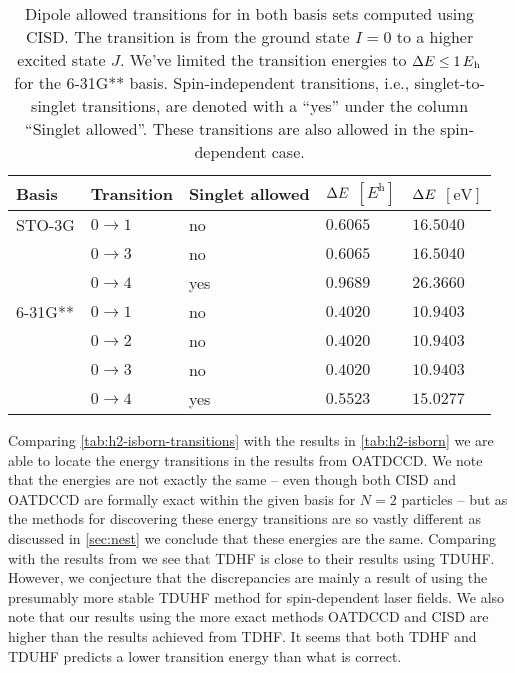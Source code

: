         \begin{table}
            \centering
            \caption{Dipole allowed transitions for  in both basis sets
            computed using CISD.
            The transition is from the ground state $I = 0$ to a higher excited
            state $J$.
            We've limited the transition energies to $\Delta \energy \leq
            \SI{1}{\hartree}$ for the 6-31G** basis.
            Spin-independent transitions, i.e., singlet-to-singlet transitions,
            are denoted with a ``yes'' under the column ``Singlet allowed''.
            These transitions are also allowed in the spin-dependent case.}
            \begin{tabular}{@{}lllll@{}}
                \toprule
                Basis & Transition & Singlet allowed
                & $\Delta E$ $[\si{\hartree}]$
                & $\Delta E$ $[\si{\electronvolt}]$ \\
                \midrule
                STO-3G & $0 \to 1$ & no & $0.6065$ & $16.5040$ \\
                & $0 \to 3$ & no & $0.6065$ & $16.5040$ \\
                & $0 \to 4$ & yes & $0.9689$ & $26.3660$ \\
                6-31G** & $0 \to 1$ & no & $0.4020$ & $10.9403$ \\
                & $0 \to 2$ & no & $0.4020$ & $10.9403$ \\
                & $0 \to 3$ & no & $0.4020$ & $10.9403$ \\
                & $0 \to 4$ & yes & $0.5523$ & $15.0277$ \\
                \bottomrule
            \end{tabular}
            \label{tab:h2-isborn-transitions}
        \end{table}
        Comparing \autoref{tab:h2-isborn-transitions} with the results in
        \autoref{tab:h2-isborn} we are able to locate the energy transitions in the
        results from OATDCCD.
        We note that the energies are not exactly the same -- even though both
        CISD and OATDCCD are formally exact within the given basis for $N = 2$
        particles -- but as the methods for discovering these energy transitions
        are so vastly different as discussed in \autoref{sec:nest} we conclude
        that these energies are the same.
        Comparing with the results from \citeauthor{isborn} we see that TDHF is
        close to their results using TDUHF.
        However, we conjecture that the discrepancies are mainly a result of
        \citeauthor{isborn} using the presumably more stable TDUHF method for
        spin-dependent laser fields.
        We also note that our results using the more exact methods OATDCCD and
        CISD are higher than the results achieved from TDHF.
        It seems that both TDHF and TDUHF predicts a lower transition energy
        than what is correct.

